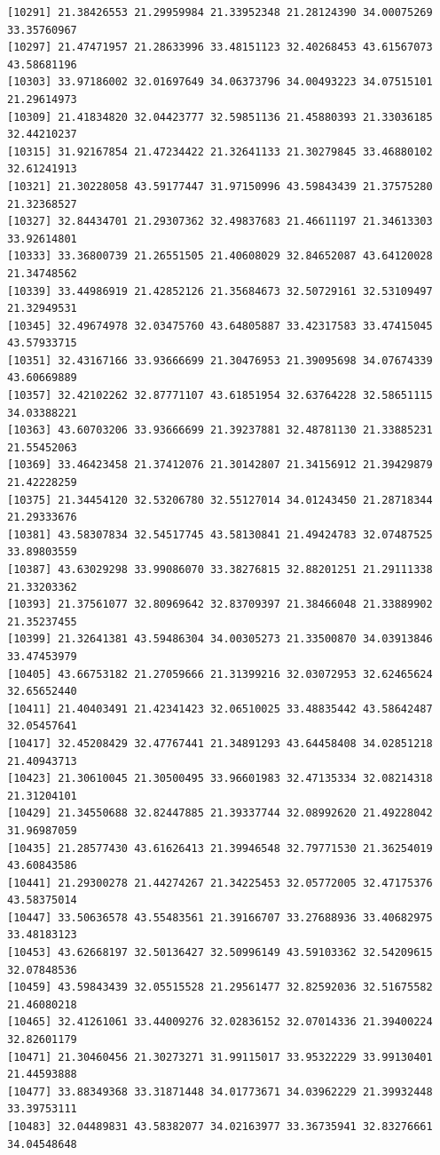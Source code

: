 \documentclass[
  letterpaper,
  DIV=11,
  numbers=noendperiod]{scrartcl}
\begin{document}
\begin{verbatim}
[10291] 21.38426553 21.29959984 21.33952348 21.28124390 34.00075269 33.35760967
[10297] 21.47471957 21.28633996 33.48151123 32.40268453 43.61567073 43.58681196
[10303] 33.97186002 32.01697649 34.06373796 34.00493223 34.07515101 21.29614973
[10309] 21.41834820 32.04423777 32.59851136 21.45880393 21.33036185 32.44210237
[10315] 31.92167854 21.47234422 21.32641133 21.30279845 33.46880102 32.61241913
[10321] 21.30228058 43.59177447 31.97150996 43.59843439 21.37575280 21.32368527
[10327] 32.84434701 21.29307362 32.49837683 21.46611197 21.34613303 33.92614801
[10333] 33.36800739 21.26551505 21.40608029 32.84652087 43.64120028 21.34748562
[10339] 33.44986919 21.42852126 21.35684673 32.50729161 32.53109497 21.32949531
[10345] 32.49674978 32.03475760 43.64805887 33.42317583 33.47415045 43.57933715
[10351] 32.43167166 33.93666699 21.30476953 21.39095698 34.07674339 43.60669889
[10357] 32.42102262 32.87771107 43.61851954 32.63764228 32.58651115 34.03388221
[10363] 43.60703206 33.93666699 21.39237881 32.48781130 21.33885231 21.55452063
[10369] 33.46423458 21.37412076 21.30142807 21.34156912 21.39429879 21.42228259
[10375] 21.34454120 32.53206780 32.55127014 34.01243450 21.28718344 21.29333676
[10381] 43.58307834 32.54517745 43.58130841 21.49424783 32.07487525 33.89803559
[10387] 43.63029298 33.99086070 33.38276815 32.88201251 21.29111338 21.33203362
[10393] 21.37561077 32.80969642 32.83709397 21.38466048 21.33889902 21.35237455
[10399] 21.32641381 43.59486304 34.00305273 21.33500870 34.03913846 33.47453979
[10405] 43.66753182 21.27059666 21.31399216 32.03072953 32.62465624 32.65652440
[10411] 21.40403491 21.42341423 32.06510025 33.48835442 43.58642487 32.05457641
[10417] 32.45208429 32.47767441 21.34891293 43.64458408 34.02851218 21.40943713
[10423] 21.30610045 21.30500495 33.96601983 32.47135334 32.08214318 21.31204101
[10429] 21.34550688 32.82447885 21.39337744 32.08992620 21.49228042 31.96987059
[10435] 21.28577430 43.61626413 21.39946548 32.79771530 21.36254019 43.60843586
[10441] 21.29300278 21.44274267 21.34225453 32.05772005 32.47175376 43.58375014
[10447] 33.50636578 43.55483561 21.39166707 33.27688936 33.40682975 33.48183123
[10453] 43.62668197 32.50136427 32.50996149 43.59103362 32.54209615 32.07848536
[10459] 43.59843439 32.05515528 21.29561477 32.82592036 32.51675582 21.46080218
[10465] 32.41261061 33.44009276 32.02836152 32.07014336 21.39400224 32.82601179
[10471] 21.30460456 21.30273271 31.99115017 33.95322229 33.99130401 21.44593888
[10477] 33.88349368 33.31871448 34.01773671 34.03962229 21.39932448 33.39753111
[10483] 32.04489831 43.58382077 34.02163977 33.36735941 32.83276661 34.04548648

\end{verbatim}
\end{document}

